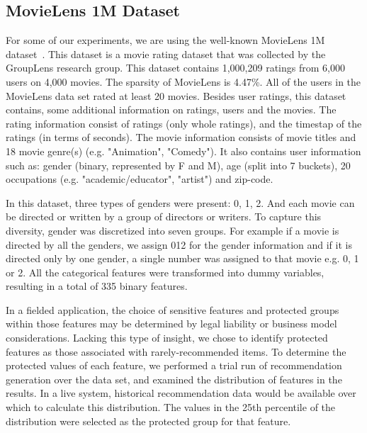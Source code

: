     \subsection{MovieLens 1M Dataset}
    For some of our experiments, we are using the well-known MovieLens 1M dataset~\cite{movielens}. This dataset is a movie rating dataset that was collected by the GroupLens research group. This dataset contains 1,000,209 ratings from 6,000 users on 4,000 movies. The sparsity of MovieLens is 4.47\%. All of the users in the MovieLens data set rated at least 20 movies.
    Besides user ratings, this dataset contains, some additional information on ratings, users and the movies. The rating information consist of ratings (only whole ratings), and the timestap of the ratings (in terms of seconds). The movie information consists of movie titles and 18 movie genre(s) (e.g. "Animation", "Comedy"). It also contains user information such as: gender (binary, represented by F and M), age (split into 7 buckets), 20 occupations (e.g. "academic/educator", "artist") and zip-code.
    
    
     In this dataset, three types of genders were present: 0, 1, 2. And each movie can be directed or written by a group of directors or writers. To capture this diversity, gender was discretized into seven groups. For example if a movie is directed by all the genders, we assign 012 for the gender information and if it is directed only by one gender, a single number was assigned to that movie e.g. 0, 1 or 2. All the categorical features were transformed into dummy variables, resulting in a total of 335 binary features.
    
    In a fielded application, the choice of sensitive features and protected groups within those features may be determined by legal liability or business model considerations. Lacking this type of insight, we chose to identify protected features as those associated with rarely-recommended items. To determine the protected values of each feature, we performed a trial run of recommendation generation over the data set, and examined the distribution of features in the results. In a live system, historical recommendation data would be available over which to calculate this distribution. The values in the 25th percentile of the distribution were selected as the protected group for that feature.

    
    
